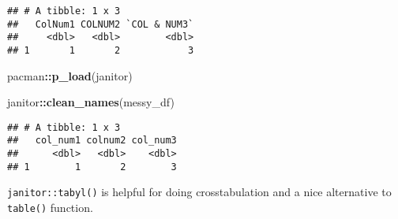 \documentclass[
]{book}
\newenvironment{Shaded}{\begin{snugshade}}{\end{snugshade}}
\newcommand{\CommentTok}[1]{\textcolor[rgb]{0.56,0.35,0.01}{\textit{#1}}}
\newcommand{\KeywordTok}[1]{\textcolor[rgb]{0.13,0.29,0.53}{\textbf{#1}}}
\newcommand{\NormalTok}[1]{#1}
\newcommand{\OperatorTok}[1]{\textcolor[rgb]{0.81,0.36,0.00}{\textbf{#1}}}
\begin{document}
\begin{verbatim}
## # A tibble: 1 x 3
##   ColNum1 COLNUM2 `COL & NUM3`
##     <dbl>   <dbl>        <dbl>
## 1       1       2            3
\end{verbatim}

\begin{Shaded}
\begin{Highlighting}[]
\NormalTok{pacman}\OperatorTok{::}\KeywordTok{p\_load}\NormalTok{(janitor)}

\NormalTok{janitor}\OperatorTok{::}\KeywordTok{clean\_names}\NormalTok{(messy\_df)}
\end{Highlighting}
\end{Shaded}

\begin{verbatim}
## # A tibble: 1 x 3
##   col_num1 colnum2 col_num3
##      <dbl>   <dbl>    <dbl>
## 1        1       2        3
\end{verbatim}

\texttt{janitor::tabyl()} is helpful for doing crosstabulation and a nice alternative to \texttt{table()} function.

\begin{Shaded}
\end{Shaded}
\end{document}
